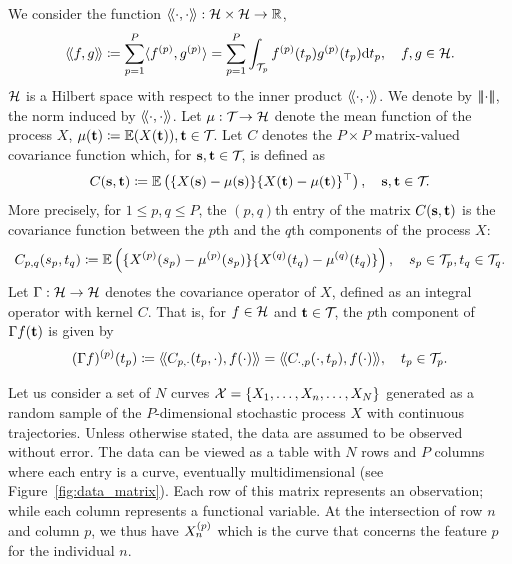 We consider the function $\langle\!\langle\cdot, \cdot\rangle\!\rangle : \mathcal{H} \times \mathcal{H} \rightarrow \mathbb{R}$,
\begin{equation}\label{eq:innerprodH}
    \langle\!\langle f, g\rangle\!\rangle \coloneqq \sum_{p=1}^{P} \langle f^{(p)}, g^{(p)}\rangle = \sum_{p=1}^{P}\int_{\mathcal{T}_{p}} f^{(p)}(t_p)g^{(p)}(t_p) {\rm d} t_p, \quad f, g \in \mathcal{H}.
\end{equation}
$\mathcal{H}$ is a Hilbert space with respect to the inner product $\langle\!\langle\cdot, \cdot\rangle\!\rangle$\citep{happMultivariateFunctionalPrincipal2015}. We denote by $\left|\!\left|\!\left|\cdot\right|\!\right|\!\right|$, the norm induced by $\langle\!\langle\cdot, \cdot\rangle\!\rangle$. Let $\mu : \mathcal{T}_{} \rightarrow \mathcal{H}$ denote the mean function of the process $X$, $\mu(\mathbf{t}) \coloneqq \mathbb{E}(X(\mathbf{t})), \mathbf{t} \in \mathcal{T}_{}$. Let $C$ denotes the $P \times P$ matrix-valued covariance function which, for $\mathbf{s}, \mathbf{t} \in \mathcal{T}_{}$, is defined as
\begin{equation}\label{eq:covariance_function}
    C(\mathbf{s}, \mathbf{t}) \coloneqq \mathbb{E}\left(\{X(\mathbf{s}) - \mu(\mathbf{s})\}\{X(\mathbf{t}) - \mu(\mathbf{t})\}^{\top}\right), \quad \mathbf{s}, \mathbf{t} \in \mathcal{T}_{}.
\end{equation}
More precisely, for $1 \leq p, q \leq P$, the $(p, q)$th entry of the matrix $C(\mathbf{s}, \mathbf{t})$ is the covariance function between the $p$th and the $q$th components of the process $X$:
\begin{equation}\label{eq:covariance_function_components}
    C_{p, q}(s_p, t_q) \coloneqq \mathbb{E}\left(\{X^{(p)}(s_p) - \mu^{(p)}(s_p)\}\{X^{(q)}(t_q) - \mu^{(q)}(t_q)\}\right), \quad s_p \in \mathcal{T}_{p}, t_q \in \mathcal{T}_{q}.
\end{equation}
Let $\Gamma : \mathcal{H} \rightarrow \mathcal{H}$ denotes the covariance operator of $X$, defined as an integral operator with kernel $C$. That is, for $f \in \mathcal{H}$ and $\mathbf{t} \in \mathcal{T}_{}$, the $p$th component of $\Gamma f(\mathbf{t})$ is given by
\begin{equation}\label{eq:covariance_operator_components}
    (\Gamma f)^{(p)}(t_p) \coloneqq \langle\!\langle C_{p, \cdot}(t_p, \cdot), f(\cdot)\rangle\!\rangle = \langle\!\langle C_{\cdot, p}(\cdot, t_p), f(\cdot)\rangle\!\rangle, \quad t_p \in \mathcal{T}_{p}.
\end{equation}

Let us consider a set of $N$ curves $\mathcal{X} = \{X_1, \ldots, X_n, \ldots, X_N\}$ generated as a random sample of the $P$-dimensional stochastic process $X$ with continuous trajectories. Unless otherwise stated, the data are assumed to be observed without error. The data can be viewed as a table with $N$ rows and $P$ columns where each entry is a curve, eventually multidimensional (see Figure~\ref{fig:data_matrix}). Each row of this matrix represents an observation; while each column represents a functional variable. At the intersection of row $n$ and column $p$, we thus have $X_n^{(p)}$ which is the curve that concerns the feature $p$ for the individual $n$.

